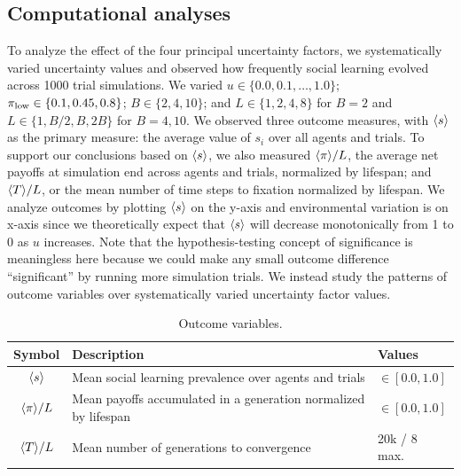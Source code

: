 \documentclass[letterpaper,11.5pt]{scrartcl}
\begin{document}
\subsection{Computational analyses}
\label{ssec:computationalAnalyses}


To analyze the effect of the four principal uncertainty factors, we systematically
varied uncertainty values and observed how frequently social learning evolved across
1000 trial simulations. We varied $u \in
\{0.0, 0.1, \ldots, 1.0\}$; $\pi_{\mathrm{low}} \in \{0.1, 0.45, 0.8\}$; $B \in \{2, 4, 10\}$;
and $L \in \{1,2,4,8\}$ for $B=2$ and $L \in \{1,B/2,B,2B\}$ for $B=4,10$.  We
observed three outcome measures, with $\langle s \rangle$ as the primary measure: 
the average value of $s_i$ over all agents and trials. To support our conclusions
based on $\langle s \rangle$, we also measured $\langle \pi \rangle / L$, the average net 
payoffs at simulation end across agents and trials, normalized by lifespan; 
and $\langle T \rangle / L$, or the mean
number of time steps to fixation normalized by lifespan. We analyze outcomes by
plotting $\langle s \rangle$ on the y-axis and environmental variation is on x-axis since we
theoretically expect that $\langle s \rangle$ will decrease monotonically from 1 to 0 as $u$
increases. Note that the hypothesis-testing concept of significance is meaningless
here because we could make any small outcome difference ``significant'' by running
more simulation trials.  We instead study the patterns of outcome variables over
systematically varied uncertainty factor values. 

\begin{table}[h]
    \caption{Outcome variables.}
    \label{tab:outcomeVariables}
    \centering %
    \begin{tabular}{cp{4.25in}p{0.85in}} \toprule

        Symbol & Description & Values \\ 

        \midrule  

        $\langle s \rangle$ & Mean social learning prevalence over agents and trials
                  & $\in [0.0, 1.0]$ \\

        $\langle \pi \rangle / L$ & Mean payoffs accumulated in a generation normalized by
        lifespan & $\in [0.0, 1.0]$ \\

        $\langle T \rangle / L$ & Mean number of generations to convergence & 20k / 8 max. \\
        \bottomrule
    \end{tabular}
\end{table}
\end{document}
